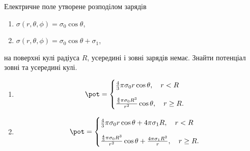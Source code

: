 \begin{problem}
Електричне поле утворене розподілом зарядів
\begin{enumerate}[label=\alph*)]
	\item $\sigma(r, \theta, \phi) = \sigma_0\cos\theta$,
	\item $\sigma(r, \theta, \phi) = \sigma_0\cos\theta + \sigma_1$,
\end{enumerate}
на поверхні кулі радіуса $R$, усередині і зовні зарядів немає. Знайти потенціал зовні та усередині кулі.
\begin{solution}
	\begin{enumerate}[label=\alph*)]
		\item%
		      \begin{equation}
			      \pot = \begin{cases}
				      \frac43\pi\sigma_0r \cos\theta, \quad r<R \\[1em]
				      \frac{\frac43\pi\sigma_0R^3}{r^2} \cos\theta, \quad r \ge R.
			      \end{cases}
		      \end{equation}
		\item%
		      \begin{equation}
			      \pot = \begin{cases}
				      \frac43\pi\sigma_0r \cos\theta + 4\pi\sigma_1 R, \quad r<R \\[1em]
				      \frac{\frac43\pi\sigma_0R^3}{r^2} \cos\theta + \frac{4\pi\sigma_1 R^2}{r}, \quad r \ge R.
			      \end{cases}
		      \end{equation}
	\end{enumerate}
\end{solution}
\end{problem}



